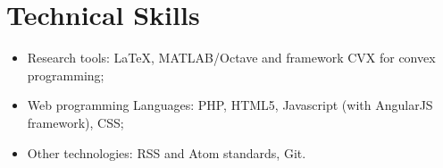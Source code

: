 \documentclass[]{article}
\begin{document}
\section{Technical Skills}\label{technical-skills}

\begin{itemize}
\itemsep1pt\parskip0pt
\item
  Research tools: LaTeX, MATLAB/Octave and framework CVX for convex
  programming;
\item
  Web programming Languages: PHP, HTML5, Javascript (with AngularJS
  framework), CSS;
\item
  Other technologies: RSS and Atom standards, Git.
\end{itemize}
\end{document}
